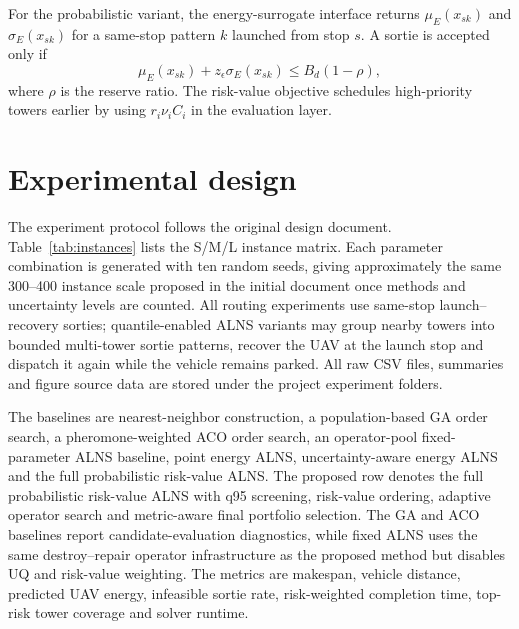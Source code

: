 \documentclass[preprint,12pt,number]{elsarticle}
\newcommand{\rev}[1]{{\color{blue}#1}}
\begin{document}
For the probabilistic variant, the energy-surrogate interface returns $\mu_E(x_{sk})$ and $\sigma_E(x_{sk})$ for a same-stop pattern $k$ launched from stop $s$. A sortie is accepted only if
\begin{equation}
\mu_E(x_{sk})+z_\epsilon\sigma_E(x_{sk})\leq B_d(1-\rho),
\label{eq:chance}
\end{equation}
where $\rho$ is the reserve ratio. The risk-value objective schedules high-priority towers earlier by using $r_i\nu_i C_i$ in the evaluation layer.

\section{Experimental design}
\label{sec:experiments}

The experiment protocol follows the original design document. Table~\ref{tab:instances} lists the S/M/L instance matrix. Each parameter combination is generated with ten random seeds, giving approximately the same 300--400 instance scale proposed in the initial document once methods and uncertainty levels are counted. \rev{All routing experiments use same-stop launch--recovery sorties; quantile-enabled ALNS variants may group nearby towers into bounded multi-tower sortie patterns, recover the UAV at the launch stop and dispatch it again while the vehicle remains parked.} All raw CSV files, summaries and figure source data are stored under the project experiment folders.

\begin{table}[t]
\centering
\caption{Proposal-aligned instance scales.}
\label{tab:instances}
\end{table}

The baselines are nearest-neighbor construction, a population-based GA order search, a pheromone-weighted ACO order search, an operator-pool fixed-parameter ALNS baseline, point energy ALNS, uncertainty-aware energy ALNS and the full probabilistic risk-value ALNS. \rev{The proposed row denotes the full probabilistic risk-value ALNS with q95 screening, risk-value ordering, adaptive operator search and metric-aware final portfolio selection.} The GA and ACO baselines report candidate-evaluation diagnostics, while fixed ALNS uses the same destroy--repair operator infrastructure as the proposed method but disables UQ and risk-value weighting. The metrics are makespan, vehicle distance, predicted UAV energy, infeasible sortie rate, risk-weighted completion time, top-risk tower coverage and solver runtime.
\end{document}
